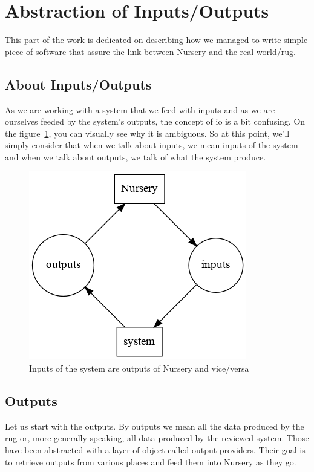 \documentclass[12pt]{article}
\theoremstyle{definition}
\theoremstyle{definition}
\begin{document}
\clearpage
\section{Abstraction of Inputs/Outputs}

This part of the work is dedicated on describing how we managed to write simple piece of software that assure the link between Nursery and the real world/\gls{rug}.

\subsection{About Inputs/Outputs}

As we are working with a system that we feed with inputs and as we are ourselves feeded by the system's outputs, the concept of \gls{io} is a bit confusing. On the figure~\ref{io_abstract}, you can visually see why it is ambiguous. So at this point, we'll simply consider that when we talk about inputs, we mean inputs of the system and when we talk about outputs, we talk of what the system produce.\\

\begin{figure}
    \centering
    \includegraphics[scale=0.6]{io_abstract.png}
    \caption{Inputs of the system are outputs of Nursery and vice/versa}
    \label{io_abstract}
\end{figure}

\subsection{Outputs}

Let us start with the outputs. By outputs we mean all the data produced by the \gls{rug} or, more generally speaking, all data produced by the reviewed system. Those have been abstracted with a layer of object called output providers. Their goal is to retrieve outputs from various places and feed them into Nursery as they go.\\
\end{document}
